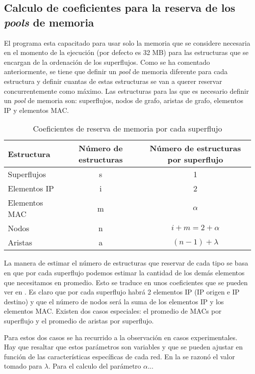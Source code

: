 \documentclass[twoside, 12pt]{epstfg}
\begin{document}
\subsection{Calculo de coeficientes para la reserva de los \textit{pools} de memoria}
El programa esta capacitado para usar solo la memoria que se considere necesaria en el momento de la ejecución (por defecto es 32 MB) para las estructuras que se encargan de la ordenación de los superflujos. Como se ha comentado anteriormente, se tiene que definir un \textit{pool} de memoria diferente para cada estructura y definir cuantas de estas estructuras se van a querer reservar concurrentemente como máximo. Las estructuras para las que es necesario definir un \textit{pool} de memoria son: superflujos, nodos de grafo, aristas de grafo, elementos IP y elementos MAC.

\begin{table}[hbtp]
	\centering
	\small
	\begin{tabular}{lcc}
		\toprule \textbf{Estructura} & \textbf{Número de estructuras}  & \textbf{Número de estructuras por superflujo} \\ \midrule
		Superflujos & s & 1 \\
		Elementos IP & i & 2 \\
		Elementos MAC & m & $\alpha$ \\
		Nodos & n & $i + m = 2 + \alpha$ \\
		Aristas & a & $(n - 1) + \lambda$  \\ \bottomrule
	\end{tabular}
	\caption{Coeficientes de reserva de memoria por cada superflujo}
	\label{tab:Desarrollo:Coeficientes memoria}
\end{table}

La manera de estimar el número de estructuras que reservar de cada tipo se basa en que por cada superflujo podemos estimar la cantidad de los demás elementos que necesitamos en promedio. Esto se traduce en unos coeficientes que se pueden ver en . Es claro que por cada superflujo habrá 2 elementos IP (IP origen e IP destino) y que el número de nodos será la suma de los elementos IP y los elementos MAC. Existen dos casos especiales: el promedio de MACs por superflujo y el promedio de aristas por superflujo.

Para estos dos casos se ha recurrido a la observación en casos experimentales. Hay que resaltar que estos parámetros son variables y que se pueden ajustar en función de las características específicas de cada red. En la  se razonó el valor tomado para $\lambda$. Para el calculo del parámetro $\alpha$...
\end{document}
